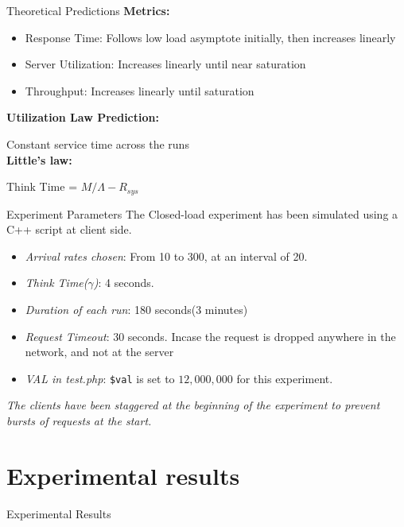 \documentclass[10pt]{beamer}
\begin{document}
\begin{frame}{Theoretical Predictions}
    \textbf{Metrics:}
    \begin{itemize}
        \item Response Time: Follows low load asymptote initially, then increases linearly
        \item Server Utilization: Increases linearly until near saturation
        \item Throughput: Increases linearly until saturation
    \end{itemize}
    \textbf{Utilization Law Prediction:}
    
    Constant service time across the runs
    \\
    \textbf{Little's law:} 
    
    Think Time = $M/\Lambda - R_{sys}$
\end{frame}

\begin{frame}{Experiment Parameters}
    The Closed-load experiment has been simulated using a C++ script at client side.
    \begin{itemize}
        \item \textit{Arrival rates chosen}: From 10 to 300, at an interval of 20.
        \item \textit{Think Time($\gamma$)}: 4 seconds.
        \item \textit{Duration of each run}: 180 seconds(3 minutes)
        \item \textit{Request Timeout}: 30 seconds. Incase the request is dropped anywhere in the network, and not at the server
        \item \textit{VAL in test.php}: \texttt{\$val} is set to $12,000,000$ for this experiment.
        
    \end{itemize}
    \textit{The clients have been staggered at the beginning of the experiment to prevent bursts of requests at the start.}
\end{frame}

\section{Experimental results}
\begin{frame}{}
    \begin{center}
        \Huge Experimental Results
    \end{center} 
\end{frame}
\end{document}
